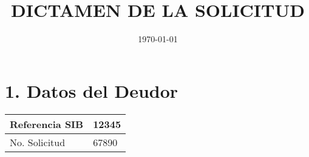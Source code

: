 \documentclass{article}%
\title{DICTAMEN DE LA SOLICITUD}%
\author{}%
\date{\today}%
\begin{document}
%
\normalsize%
\maketitle%
\section*{1. Datos del Deudor}%
\label{sec:1.DatosdelDeudor}%
\begin{tabular}{|l|l|}%
\hline%
Referencia SIB&12345\\%
\hline%
No. Solicitud&67890\\%
\hline%
\end{tabular}

%
\end{document}
